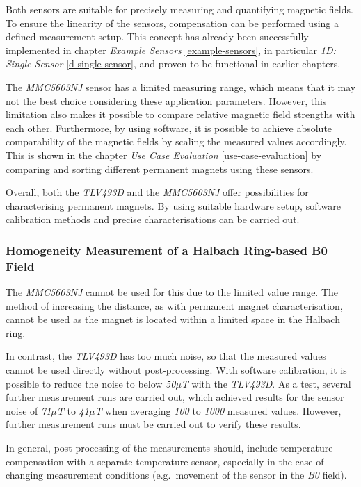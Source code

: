 Both sensors are suitable for precisely measuring and quantifying
magnetic fields. To ensure the linearity of the sensors, compensation
can be performed using a defined measurement setup. This concept has
already been successfully implemented in chapter \emph{Example Sensors}
\ref{example-sensors}, in particular \emph{1D: Single Sensor}
\ref{d-single-sensor}, and proven to be functional in earlier chapters.

The \emph{MMC5603NJ} sensor has a limited measuring range, which means
that it may not the best choice considering these application
parameters. However, this limitation also makes it possible to compare
relative magnetic field strengths with each other. Furthermore, by using
software, it is possible to achieve absolute comparability of the
magnetic fields by scaling the measured values accordingly. This is
shown in the chapter \emph{Use Case Evaluation}
\ref{use-case-evaluation} by comparing and sorting different permanent
magnets using these sensors.

Overall, both the \emph{TLV493D} and the \emph{MMC5603NJ} offer
possibilities for characterising permanent magnets. By using suitable
hardware setup, software calibration methods and precise
characterisations can be carried out.

\hypertarget{homogeneity-measurement-of-a-halbach-ring-based-b0-field}{%
\subsubsection{Homogeneity Measurement of a Halbach Ring-based B0
Field}\label{homogeneity-measurement-of-a-halbach-ring-based-b0-field}}

The \emph{MMC5603NJ} cannot be used for this due to the limited value
range. The method of increasing the distance, as with permanent magnet
characterisation, cannot be used as the magnet is located within a
limited space in the Halbach ring.

In contrast, the \emph{TLV493D} has too much noise, so that the measured
values cannot be used directly without post-processing. With software
calibration, it is possible to reduce the noise to below
\emph{50\(\mu\)T} with the \emph{TLV493D}. As a test, several further
measurement runs are carried out, which achieved results for the sensor
noise of \emph{71\(\mu\)T} to \emph{41\(\mu\)T} when averaging
\emph{100} to \emph{1000} measured values. However, further measurement
runs must be carried out to verify these results.

In general, post-processing of the measurements should, include
temperature compensation with a separate temperature sensor, especially
in the case of changing measurement conditions (e.g.~movement of the
sensor in the \emph{B0} field).

